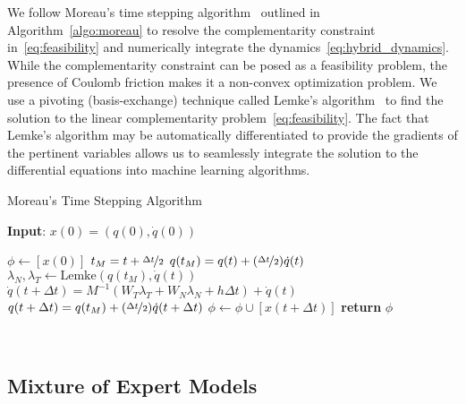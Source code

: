 We follow Moreau's time stepping algorithm~\cite{glocker2005formulation}
outlined in Algorithm~\eqref{algo:moreau} to resolve the complementarity
constraint in~\eqref{eq:feasibility} and numerically integrate the
dynamics~\eqref{eq:hybrid_dynamics}. While the complementarity constraint can be
posed as a feasibility problem, the presence of Coulomb friction makes it a
non-convex optimization problem. We use a pivoting (basis-exchange) technique
called Lemke's algorithm~\cite{acary2008numerical} to find the solution to the
linear complementarity problem~\eqref{eq:feasibility}. 
The fact that Lemke's algorithm may be automatically differentiated to provide
the gradients of the pertinent variables allows us to seamlessly integrate the
solution to the differential equations into machine learning algorithms.


\begin{algorithm}[H]
    \caption{Moreau's Time Stepping Algorithm}
    \label{algo:moreau}
    \small
    \hspace*{\algorithmicindent} \textbf{Input}: $x(0) = (q(0), \dot{q}(0))$
    \begin{algorithmic}[1]
      \State $\phi \leftarrow  [x(0)]$ 
           
            \State $t_M = t + \nicefrac{\Delta t}{2}$
            \State $q(t_M) = q(t) +  (\nicefrac{\Delta t}{2}) \dot{q}(t) $
            \State $\lambda_N, \lambda_T \leftarrow \text{Lemke}(q(t_M), \dot{q}(t))$ 
            \State $\dot{q}(t+\Delta t) = M^{-1}(W_T \lambda_T + W_N \lambda_N + h\Delta t) + \dot{q}(t)$
            \State $q(t + \Delta t) =  q(t_M) +  (\nicefrac{\Delta t}{2})\dot{q}(t+\Delta t)$
            \State $\phi \leftarrow \phi \cup [x(t+\Delta t)]$
          \EndFor
        \State \textbf{return} $\phi$
    \end{algorithmic}
\end{algorithm}~


\subsection{Mixture of Expert Models}
\label{ssec:mixture_of_experts}


